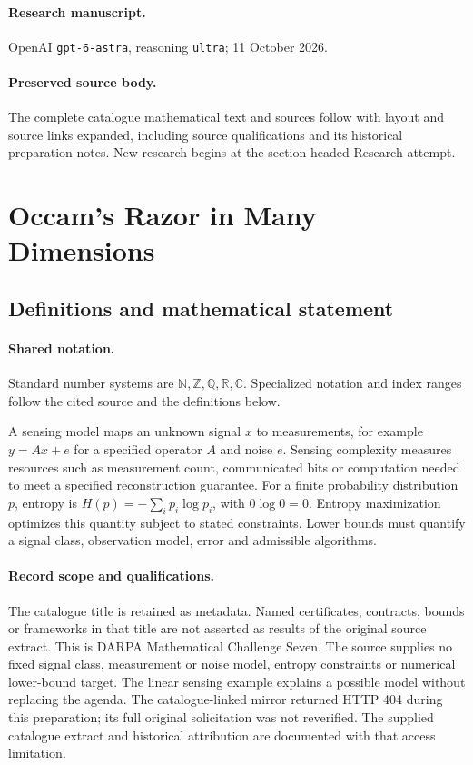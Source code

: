 \documentclass[11pt]{article}
\begin{document}
\paragraph{Research manuscript.} OpenAI \texttt{gpt-6-astra}, reasoning \texttt{ultra}; 11 October 2026.
\paragraph{Preserved source body.} The complete catalogue mathematical text and sources follow with layout and source links expanded, including source qualifications and its historical preparation notes. New research begins at the section headed Research attempt.

\section{Occam's Razor in Many Dimensions}\label{statement}

\subsection{Definitions and mathematical statement}

\paragraph{Shared notation.}Standard number systems are $\mathbb N,\mathbb Z,\mathbb Q,\mathbb R,\mathbb C$. Specialized notation and index ranges follow the cited source and the definitions below.


A sensing model maps an unknown signal $x$ to measurements, for example $y=Ax+e$ for a specified operator $A$ and noise $e$. Sensing complexity measures resources such as measurement count, communicated bits or computation needed to meet a specified reconstruction guarantee. For a finite probability distribution $p$, entropy is $H(p)=-\sum_i p_i\log p_i$, with $0\log0=0$. Entropy maximization optimizes this quantity subject to stated constraints. Lower bounds must quantify a signal class, observation model, error and admissible algorithms.
\paragraph{Record scope and qualifications.}
The catalogue title is retained as metadata. Named certificates, contracts, bounds or frameworks in that title are not asserted as results of the original source extract.
This is DARPA Mathematical Challenge Seven. The source supplies no fixed signal class, measurement or noise model, entropy constraints or numerical lower-bound target. The linear sensing example explains a possible model without replacing the agenda. The catalogue-linked mirror returned HTTP 404 during this preparation; its full original solicitation was not reverified. The supplied catalogue extract and historical attribution are documented with that access limitation.
\end{document}

